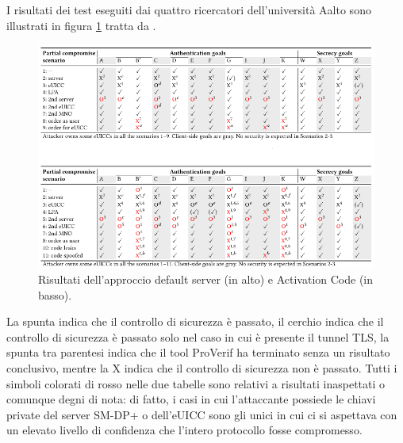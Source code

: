 \documentclass[10pt, oneside]{book}
\begin{document}
I risultati dei test eseguiti dai quattro ricercatori dell'università Aalto sono illustrati in figura \ref{fig:results2022} tratta da \cite{Sec-analysis}.
\begin{figure}
\includegraphics[width=\linewidth]{results2022.png}
\caption{Risultati dell'approccio default server (in alto) e Activation Code (in basso).}
\label{fig:results2022}
\end{figure}
La spunta indica che il controllo di sicurezza è passato, il cerchio indica che il controllo di sicurezza è passato solo nel caso in cui è presente il tunnel TLS, la spunta tra parentesi indica che il tool ProVerif ha terminato senza un risultato conclusivo, mentre la X indica che il controllo di sicurezza non è passato. Tutti i simboli colorati di rosso nelle due tabelle sono relativi a risultati inaspettati o comunque degni di nota: di fatto, i casi in cui l'attaccante possiede le chiavi private del server SM-DP+ o dell'eUICC sono gli unici in cui ci si aspettava con un elevato livello di confidenza che l'intero protocollo fosse compromesso.
\end{document}
